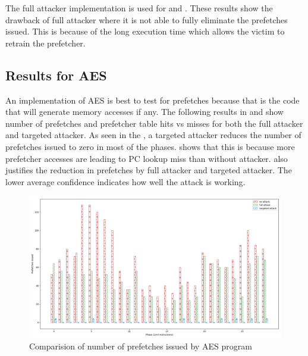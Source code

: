 The full attacker implementation is used for  and
.
These results show the drawback of full attacker where it is not able to
fully eliminate the prefetches issued. This is because of the long execution
time which allows the victim to retrain the prefetcher.

\subsection{Results for AES}

An implementation of AES is best to test for prefetches because that is the code
that will generate memory accesses if any. The following results
in  and  show
number of prefetches and prefetcher table hits vs misses for both
the full attacker and targeted attacker.
As seen in the , a targeted attacker
reduces the number of prefetches issued to zero in most of the phases.
 shows that this is because more
prefetcher accesses are leading to PC lookup miss than without attacker.
 also justifies the reduction in prefetches
by full attacker and targeted attacker.
The lower average confidence indicates how well the attack is working.

\begin{figure}[h]
    \centering
    \includegraphics[width=\textwidth]{figures/pf_issued}
    \caption{Comparision of number of prefetches issued by AES program}
    \label{fig:targeted_attack}
\end{figure}

